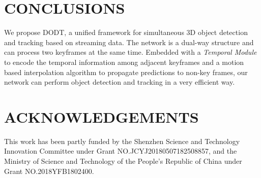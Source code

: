 \documentclass[letterpaper, 10pt, conference]{ieeeconf}  %
\begin{document}
\begin{table}
	\vspace{-0.2cm}
	\caption*{TABLE IV: Comparison of publicly available methods of 3D multi-object tracking in the KITTI Tracking Benchmark. The time for object detection is not included in the specified runtime.}
	\label{label:result_kitti}
\end{table}
\section{CONCLUSIONS}
\label{sec:conclusions} We propose DODT, a unified framework for simultaneous 3D object detection and tracking based on streaming data. The network is a dual-way structure and can  process two keyframes at the same time. Embedded with a \textit{Temporal Module} to encode the temporal information among adjacent keyframes and a motion based interpolation algorithm to propagate predictions to non-key frames, our network can perform object detection and tracking in a very efficient way.
\section{ACKNOWLEDGEMENTS}
This work has been partly funded by the Shenzhen Science and Technology Innovation Committee under Grant NO.JCYJ20180507182508857, and the Ministry of Science and Technology of the People's Republic of China under Grant NO.2018YFB1802400.


\end{document}
